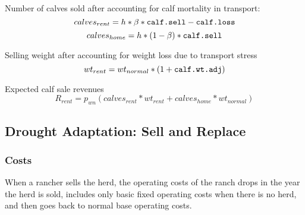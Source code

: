 \documentclass[11pt]{article}
\begin{document}
Number of calves sold after accounting for calf mortality in transport:
\begin{equation} 
calves_{rent} = h * \beta * \verb!calf.sell! - \verb!calf.loss!
\end{equation}
\begin{equation}
calves_{home} = h * (1-\beta) * \verb!calf.sell!
\end{equation}
  
Selling weight after accounting for weight loss due to transport stress
\begin{equation}
wt_{rent} = wt_{normal} * (1 + \verb!calf.wt.adj!)
\end{equation}
  
Expected calf sale revenues
\begin{equation}
R_{rent} = p_{wn} ( calves_{rent} * wt_{rent} + calves_{home} * wt_{normal})
\end{equation} 

\subsection{Drought Adaptation: Sell and Replace}

\subsubsection{Costs}
When a rancher sells the herd, the operating costs of the ranch drops in the year the herd is sold, includes only basic fixed operating costs when there is no herd, and then goes back to normal base operating costs.
\end{document}
